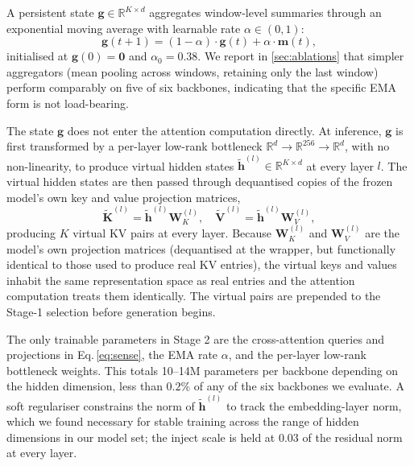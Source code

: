 A persistent state $\mathbf{g}\in\mathbb{R}^{K\times d}$ aggregates
window-level summaries through an exponential moving average with
learnable rate $\alpha\in(0,1)$:
\begin{equation}
    \mathbf{g}(t{+}1) = (1-\alpha)\cdot\mathbf{g}(t) + \alpha\cdot\mathbf{m}(t),
    \label{eq:ema}
\end{equation}
initialised at $\mathbf{g}(0)=\mathbf{0}$ and $\alpha_0=0.38$. We
report in \cref{sec:ablations} that simpler aggregators (mean
pooling across windows, retaining only the last window) perform
comparably on five of six backbones, indicating that the specific EMA
form is not load-bearing.

The state $\mathbf{g}$ does not enter the attention computation
directly. At inference, $\mathbf{g}$ is first transformed by a
per-layer low-rank bottleneck
$\mathbb{R}^d\to\mathbb{R}^{256}\to\mathbb{R}^d$, with no
non-linearity, to produce virtual hidden states
$\tilde{\mathbf{h}}^{(l)}\in\mathbb{R}^{K\times d}$ at every layer
$l$. The virtual hidden states are then passed through dequantised
copies of the frozen model's own key and value projection matrices,
\begin{equation}
    \tilde{\mathbf{K}}^{(l)} = \tilde{\mathbf{h}}^{(l)} \mathbf{W}_K^{(l)},\quad
    \tilde{\mathbf{V}}^{(l)} = \tilde{\mathbf{h}}^{(l)} \mathbf{W}_V^{(l)},
    \label{eq:virtkv}
\end{equation}
producing $K$ virtual KV pairs at every layer. Because
$\mathbf{W}_K^{(l)}$ and $\mathbf{W}_V^{(l)}$ are the model's own
projection matrices (dequantised at the wrapper, but functionally
identical to those used to produce real KV entries), the virtual keys
and values inhabit the same representation space as real entries and
the attention computation treats them identically. The virtual pairs
are prepended to the Stage-1 selection before generation begins.

The only trainable parameters in Stage 2 are the cross-attention
queries and projections in Eq.\,\ref{eq:sense}, the EMA rate $\alpha$,
and the per-layer low-rank bottleneck weights. This totals 10--14M
parameters per backbone depending on the hidden dimension, less than
$0.2\%$ of any of the six backbones we evaluate. A soft regulariser
constrains the norm of $\tilde{\mathbf{h}}^{(l)}$ to track the
embedding-layer norm, which we found necessary for stable training
across the range of hidden dimensions in our model set; the inject
scale is held at $0.03$ of the residual norm at every layer.


